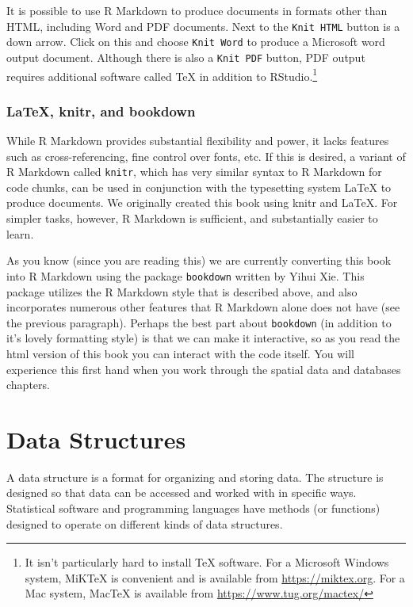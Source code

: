 \documentclass[]{krantz}
\theoremstyle{definition}
\theoremstyle{definition}
\theoremstyle{definition}
\theoremstyle{remark}
\begin{document}
It is possible to use R Markdown to produce documents in formats other
than HTML, including Word and PDF documents. Next to the
\texttt{Knit\ HTML} button is a down arrow. Click on this and choose
\texttt{Knit\ Word} to produce a Microsoft word output document.
Although there is also a \texttt{Knit\ PDF} button, PDF output requires
additional software called TeX in addition to RStudio.\footnote{It isn't
  particularly hard to install TeX software. For a Microsoft Windows
  system, MiKTeX is convenient and is available from
  \url{https://miktex.org}. For a Mac system, MacTeX is available from
  \url{https://www.tug.org/mactex/}}

\subsection{LaTeX, knitr, and bookdown}\label{latex-knitr-and-bookdown}

While R Markdown provides substantial flexibility and power, it lacks
features such as cross-referencing, fine control over fonts, etc. If
this is desired, a variant of R Markdown called \texttt{knitr}, which
has very similar syntax to R Markdown for code chunks, can be used in
conjunction with the typesetting system LaTeX to produce documents. We
originally created this book using knitr and LaTeX. For simpler tasks,
however, R Markdown is sufficient, and substantially easier to learn.

As you know (since you are reading this) we are currently converting
this book into R Markdown using the package \texttt{bookdown} written by
Yihui Xie. This package utilizes the R Markdown style that is described
above, and also incorporates numerous other features that R Markdown
alone does not have (see the previous paragraph). Perhaps the best part
about \texttt{bookdown} (in addition to it's lovely formatting style) is
that we can make it interactive, so as you read the html version of this
book you can interact with the code itself. You will experience this
first hand when you work through the spatial data and databases
chapters.

\chapter{Data Structures}\label{data-structures}

A data structure is a format for organizing and storing data. The
structure is designed so that data can be accessed and worked with in
specific ways. Statistical software and programming languages have
methods (or functions) designed to operate on different kinds of data
structures.
\end{document}
